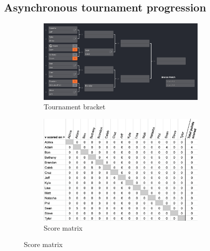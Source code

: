 \documentclass[letterpaper, 10 pt, conference]{ieeeconf}  %
\begin{document}
\subsection{Asynchronous tournament progression}
\begin{figure}[h!b]
        \centering
        \begin{subfigure}[ht]{0.5\textwidth}
                \centering
                \includegraphics[width=0.9\textwidth]{fig/singles-bracket_1.png}
                \caption{Tournament bracket}
        \end{subfigure}
        \begin{subfigure}[ht]{0.4\textwidth}
                \centering
                \includegraphics[width=0.9\textwidth]{fig/score-matrix_1.png}
                \caption{Score matrix}
        \end{subfigure}


\end{figure}
\end{document}
